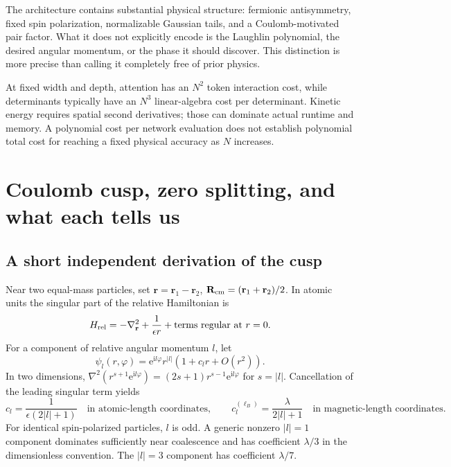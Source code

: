 \documentclass[11pt,letterpaper]{article}
\newcommand{\rr}{\mathbf r}
\newcommand{\ee}{\mathrm e}
\newcommand{\ii}{\mathrm i}
\begin{document}
The architecture contains substantial physical structure: fermionic antisymmetry, fixed spin polarization, normalizable Gaussian tails, and a Coulomb-motivated pair factor. What it does not explicitly encode is the Laughlin polynomial, the desired angular momentum, or the phase it should discover. This distinction is more precise than calling it completely free of prior physics.

At fixed width and depth, attention has an $N^2$ token interaction cost, while determinants typically have an $N^3$ linear-algebra cost per determinant. Kinetic energy requires spatial second derivatives; those can dominate actual runtime and memory. A polynomial cost per network evaluation does not establish polynomial total cost for reaching a fixed physical accuracy as $N$ increases.

\section{Coulomb cusp, zero splitting, and what each tells us}
\label{sec:cusp}

\subsection{A short independent derivation of the cusp}

Near two equal-mass particles, set $\rr=\rr_1-\rr_2$, $\mathbf R_{\rm cm}=(\rr_1+\rr_2)/2$. In atomic units the singular part of the relative Hamiltonian is
\begin{equation}
 H_{\rm rel}=-\nabla_{\rr}^2+\frac1{\epsilon r}+\text{terms regular at }r=0.
\end{equation}
For a component of relative angular momentum $l$, let
\begin{equation}
 \psi_l(r,\varphi)=\ee^{\ii l\varphi}r^{|l|}(1+c_l r+O(r^2)).
\end{equation}
In two dimensions,
$\nabla^2(r^{s+1}\ee^{\ii l\varphi})=(2s+1)r^{s-1}\ee^{\ii l\varphi}$ for $s=|l|$.
Cancellation of the leading singular term yields
\begin{equation}
 c_l=\frac1{\epsilon(2|l|+1)}\quad\text{in atomic-length coordinates},\qquad
 c_l^{(\ell_B)}=\frac{\lambda}{2|l|+1}\quad\text{in magnetic-length coordinates}.
 \label{eq:cusp}
\end{equation}
For identical spin-polarized particles, $l$ is odd. A generic nonzero $|l|=1$ component dominates sufficiently near coalescence and has coefficient $\lambda/3$ in the dimensionless convention. The $|l|=3$ component has coefficient $\lambda/7$.
\end{document}
